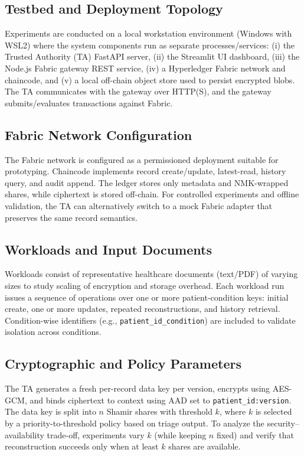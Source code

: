 \documentclass{IEEEtran}
\begin{document}
\subsection{Testbed and Deployment Topology}
Experiments are conducted on a local workstation environment (Windows with WSL2) where the system components run as separate processes/services: (i) the Trusted Authority (TA) FastAPI server, (ii) the Streamlit UI dashboard, (iii) the Node.js Fabric gateway REST service, (iv) a Hyperledger Fabric network and chaincode, and (v) a local off-chain object store used to persist encrypted blobs. The TA communicates with the gateway over HTTP(S), and the gateway submits/evaluates transactions against Fabric.

\subsection{Fabric Network Configuration}
The Fabric network is configured as a permissioned deployment suitable for prototyping. Chaincode implements record create/update, latest-read, history query, and audit append. The ledger stores only metadata and NMK-wrapped shares, while ciphertext is stored off-chain. For controlled experiments and offline validation, the TA can alternatively switch to a mock Fabric adapter that preserves the same record semantics.

\subsection{Workloads and Input Documents}
Workloads consist of representative healthcare documents (text/PDF) of varying sizes to study scaling of encryption and storage overhead. Each workload run issues a sequence of operations over one or more patient-condition keys: initial create, one or more updates, repeated reconstructions, and history retrieval. Condition-wise identifiers (e.g., \texttt{patient\_id\_condition}) are included to validate isolation across conditions.

\subsection{Cryptographic and Policy Parameters}
The TA generates a fresh per-record data key per version, encrypts using AES-GCM, and binds ciphertext to context using AAD set to \texttt{patient\_id:version}. The data key is split into $n$ Shamir shares with threshold $k$, where $k$ is selected by a priority-to-threshold policy based on triage output. To analyze the security--availability trade-off, experiments vary $k$ (while keeping $n$ fixed) and verify that reconstruction succeeds only when at least $k$ shares are available.
\end{document}
